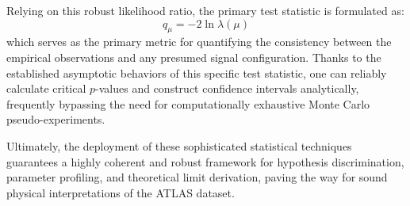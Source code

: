 Relying on this robust likelihood ratio, the primary test statistic is formulated as:
\begin{equation}
q_\mu = -2 \ln \lambda(\mu)
\end{equation}
which serves as the primary metric for quantifying the consistency between the empirical observations and any presumed signal configuration. Thanks to the established asymptotic behaviors of this specific test statistic, one can reliably calculate critical $p$-values and construct confidence intervals analytically, frequently bypassing the need for computationally exhaustive Monte Carlo pseudo-experiments.

Ultimately, the deployment of these sophisticated statistical techniques guarantees a highly coherent and robust framework for hypothesis discrimination, parameter profiling, and theoretical limit derivation, paving the way for sound physical interpretations of the ATLAS dataset.